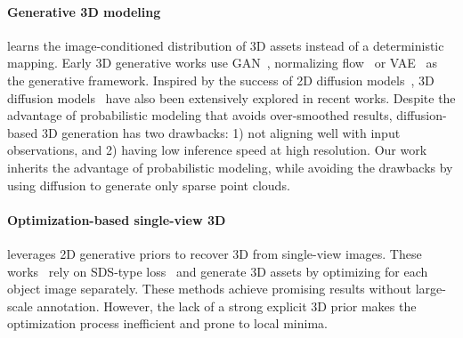 \paragraph{Generative 3D modeling}
learns the image-conditioned distribution of 3D assets instead of a deterministic mapping. Early 3D generative works use GAN~\cite{valsesia2018learning,hui2020progressive,cai2020learning,gao2022get3d}, normalizing flow~\cite{yang2019pointflow,klokov2020discrete} or VAE~\cite{wu2019sagnet,mittal2022autosdf,gao2021tm} as the generative framework. Inspired by the success of 2D diffusion models~\cite{dhariwal2021diffusion,rombach2022high}, 3D diffusion models~\cite{nichol2022point,jun2023shap,liu2023one2345++,shue20233d,chou2023diffusion,shim2023diffusion,cheng2023sdfusion,li2023diffusion,liu2023zero,shi2023mvdream,liu2023syncdreamer,huang2024pointinfinity,yariv2024mosaic,chen2023single,zhao2023michelangelo,lan2024ln3diff} have also been extensively explored in recent works. Despite the advantage of probabilistic modeling that avoids over-smoothed results, diffusion-based 3D generation has two drawbacks: 1) not aligning well with input observations, and 2) having low inference speed at high resolution. Our work inherits the advantage of probabilistic modeling, while avoiding the drawbacks by using diffusion to generate only sparse point clouds.

\paragraph{Optimization-based single-view 3D} 
leverages 2D generative priors to recover 3D from single-view images. These works~\cite{melas2023realfusion,deng2023nerdi,tang2023make,gu2023nerfdiff} rely on SDS-type loss~\cite{pooledreamfusion, wang2023score} and generate 3D assets by optimizing for each object image separately. These methods achieve promising results without large-scale annotation. However, the lack of a strong explicit 3D prior makes the optimization process inefficient and prone to local minima.